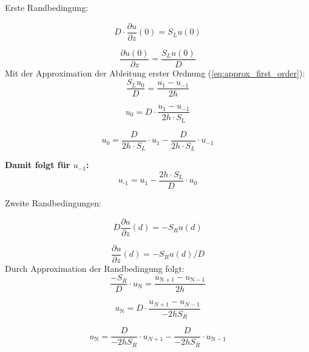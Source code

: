 Erste Randbedingung:

\begin{equation}
	D\cdot \frac{\partial u}{\partial z}(0)=S_Lu(0)
\end{equation}

\begin{equation}
	\frac{\partial u(0)}{\partial z}=\frac{S_Lu(0)}{D}
\end{equation}
Mit der Approximation der Ableitung erster Ordnung (\cref{eq:approx_first_order}):
\begin{equation}
	\frac{S_Lu_0}{D} = \frac{u_1-u_{-1}}{2h}
\end{equation}

\begin{equation}
	u_0 = D\cdot \frac{u_1-u_{-1}}{2h\cdot S_\mathrm{L}}
\end{equation}

\begin{equation}
	u_0 = \frac{D}{2h\cdot S_L} \cdot u_1 - \frac{D}{2h\cdot S_L} \cdot u_{-1}
\end{equation}

\begin{qed}
	\textbf{Damit folgt für $u_{-1}$:}
	\begin{equation}\label{eq:rand_u-1}
		u_{\text{-}1} = u_1 - \frac{2h\cdot S_L}{D} \cdot u_0
	\end{equation}
\end{qed}


Zweite Randbedingungen:

\begin{equation}
	D\frac{\partial u}{\partial z}(d)=-S_Ru(d)
\end{equation}

\begin{equation}
	\frac{\partial u}{\partial z}(d)=-S_Ru(d)/D
\end{equation}
Durch Approximation der Randbedingung folgt:
\begin{equation}
	\frac{-S_R}{D}\cdot u_\mathrm{N} = \frac{u_{\mathrm{N}+1}-u_{\mathrm{N}-1}}{2h}
\end{equation}

\begin{equation}
	u_\mathrm{N} = D\cdot \frac{u_{N+1}-u_{N-1}}{-2hS_R}
\end{equation}

\begin{equation}
	u_\mathrm{N} = \frac{D}{-2hS_R} \cdot u_{N+1} - \frac{D}{-2hS_R} \cdot u_{\mathrm{N}-1}
\end{equation}


